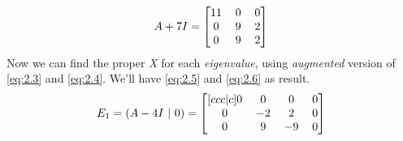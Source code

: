 \documentclass[12pt]{article}
\numberwithin{equation}{section}
\numberwithin{table}{section}
\numberwithin{figure}{section}
\begin{document}
\begin{equation}\label{eq:2.4}	
	A + 7I = 
		\renewcommand\arraystretch{1}
		\setlength\arraycolsep{6pt}
		\begin{bmatrix}
		11 & 0 & 0 \\
		0 & 9 & 2 \\
		0 & 9 & 2 \\
		\end{bmatrix}
\end{equation}
Now we can find the proper \textit{X} for each \textit{eigenvalue}, using \textit{augmented} version of \ref{eq:2.3} and \ref{eq:2.4}. We'll have \ref{eq:2.5} and \ref{eq:2.6} as result.
\begin{equation}\label{eq:2.5}
	E_1 = (A - 4I \ | \ 0)= 
	\renewcommand\arraystretch{1}
	\setlength\arraycolsep{6pt}
		\begin{bmatrix}[ccc|c]
		0 & 0 & 0 & 0\\	
		0 & -2 & 2 & 0\\
		0 & 9 & -9 & 0\\
		\end{bmatrix}
\end{equation}
\end{document}
